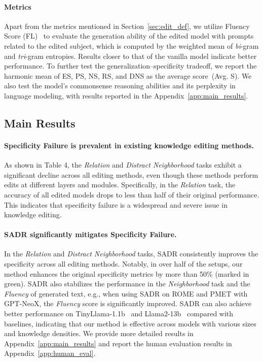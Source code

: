 \paragraph{Metrics} Apart from the metrics mentioned in Section~\ref{sec:edit_def}, we utilize Fluency Score (FL)~\citep{rome} to evaluate the generation ability of the edited model with prompts related to the edited subject, which is computed by the weighted mean of \textit{bi}-gram and \textit{tri}-gram entropies.
Results closer to that of the vanilla model indicate better performance.
To further test the generalization–specificity tradeoff, we report the harmonic mean of ES, PS, NS, RS, and DNS as the average score~(Avg. S).
We also test the model's commonsense reasoning abilities and its perplexity in language modeling, with results reported in the Appendix~\ref{app:main_results}.



\subsection{Main Results}
\label{sec:main_results}


\paragraph{Specificity Failure is prevalent in existing knowledge editing methods.}  As shown in Table 4, the \textit{Relation} and \textit{Distract Neighborhood} tasks exhibit a significant decline across all editing methods, even though these methods perform edits at different layers and modules. Specifically, in the \textit{Relation} task, the accuracy of all edited models drops to less than half of their original performance. This indicates that specificity failure is a widespread and severe issue in knowledge editing.

\paragraph{SADR significantly mitigates Specificity Failure.} In the \textit{Relation} and \textit{Distract Neighborhood} tasks, SADR consistently improves the specificity across all editing methods. 
Notably, in over half of the setups, our method enhances the original specificity metrics by more than 50\% (marked in green). 
SADR also stabilizes the performance in the \textit{Neighborhood} task and the \textit{Fluency} of generated text, e.g., when using SADR on ROME and PMET with GPT-NeoX, the \textit{Fluency} score is significantly improved.
SADR can also achieve better performance on TinyLlama-1.1b~\citep{zhang2024tinyllama} and Llama2-13b~\citep{touvron2023llama} compared with baselines, indicating that our method is effective across models with various sizes and knowledge densities.
We provide more detailed results in Appendix~\ref{app:main_results} and report the human evaluation results in Appendix~\ref{app:human_eval}.

